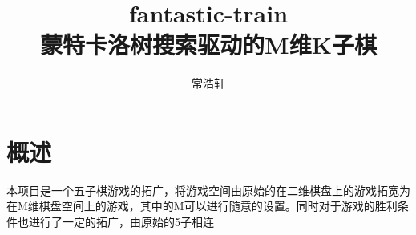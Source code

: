 \documentclass[a4paper]{ctexart}
\title{fantastic-train \\ 蒙特卡洛树搜索驱动的M维K子棋}
\author{常浩轩}
\begin{document}
    \maketitle
    \section{概述}
        本项目是一个五子棋游戏的拓广，将游戏空间由原始的在二维棋盘上的游戏拓宽为在M维棋盘空间上的游戏，其中的M可以进行随意的设置。同时对于游戏的胜利条件也进行了一定的拓广，由原始的5子相连
\end{document}
